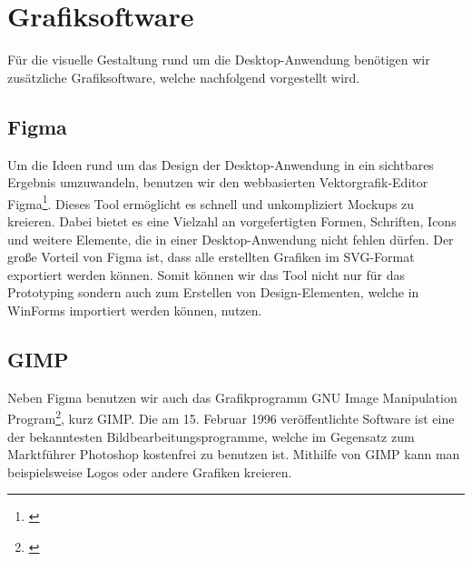 \section{Grafiksoftware}

Für die visuelle Gestaltung rund um die Desktop-Anwendung benötigen wir zusätzliche Grafiksoftware, welche nachfolgend vorgestellt wird.

\subsection{Figma}

Um die Ideen rund um das Design der Desktop-Anwendung in ein sichtbares Ergebnis umzuwandeln, benutzen wir den webbasierten Vektorgrafik-Editor Figma\footnote[3]{\cite[Vgl.][]{Figma}}. Dieses Tool ermöglicht es schnell und unkompliziert Mockups zu kreieren. Dabei bietet es eine Vielzahl an vorgefertigten Formen, Schriften, Icons und weitere Elemente, die in einer Desktop-Anwendung nicht fehlen dürfen. Der große Vorteil von Figma ist, dass alle erstellten Grafiken im SVG-Format exportiert werden können. Somit können wir das Tool nicht nur für das Prototyping sondern auch zum Erstellen von Design-Elementen, welche in WinForms importiert werden können, nutzen.

\subsection{GIMP}

Neben Figma benutzen wir auch das Grafikprogramm GNU Image Manipulation Program\footnote[4]{\cite[Vgl.][]{GIMP}}, kurz GIMP. Die am 15. Februar 1996 veröffentlichte Software ist eine der bekanntesten Bildbearbeitungsprogramme, welche im Gegensatz zum Marktführer Photoshop kostenfrei zu benutzen ist. Mithilfe von GIMP kann man beispielsweise Logos oder andere Grafiken kreieren.

